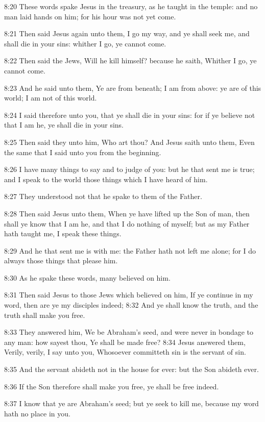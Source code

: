 8:20 These words spake Jesus in the treasury, as he taught in the
temple: and no man laid hands on him; for his hour was not yet come.

8:21 Then said Jesus again unto them, I go my way, and ye shall seek
me, and shall die in your sins: whither I go, ye cannot come.

8:22 Then said the Jews, Will he kill himself? because he saith,
Whither I go, ye cannot come.

8:23 And he said unto them, Ye are from beneath; I am from above: ye
are of this world; I am not of this world.

8:24 I said therefore unto you, that ye shall die in your sins: for if
ye believe not that I am he, ye shall die in your sins.

8:25 Then said they unto him, Who art thou? And Jesus saith unto them,
Even the same that I said unto you from the beginning.

8:26 I have many things to say and to judge of you: but he that sent
me is true; and I speak to the world those things which I have heard
of him.

8:27 They understood not that he spake to them of the Father.

8:28 Then said Jesus unto them, When ye have lifted up the Son of man,
then shall ye know that I am he, and that I do nothing of myself; but
as my Father hath taught me, I speak these things.

8:29 And he that sent me is with me: the Father hath not left me
alone; for I do always those things that please him.

8:30 As he spake these words, many believed on him.

8:31 Then said Jesus to those Jews which believed on him, If ye
continue in my word, then are ye my disciples indeed; 8:32 And ye
shall know the truth, and the truth shall make you free.

8:33 They answered him, We be Abraham's seed, and were never in
bondage to any man: how sayest thou, Ye shall be made free?  8:34
Jesus answered them, Verily, verily, I say unto you, Whosoever
committeth sin is the servant of sin.

8:35 And the servant abideth not in the house for ever: but the Son
abideth ever.

8:36 If the Son therefore shall make you free, ye shall be free
indeed.

8:37 I know that ye are Abraham's seed; but ye seek to kill me,
because my word hath no place in you.

